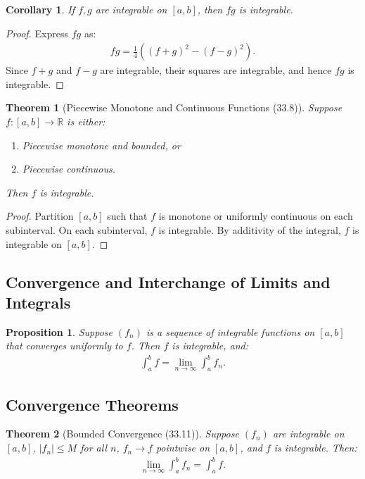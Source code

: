 \documentclass[9pt]{article}
\theoremstyle{definition}
\theoremstyle{plain}
\newtheorem{theorem}{Theorem}
\newtheorem{proposition}{Proposition}
\newtheorem{corollary}{Corollary}
\begin{document}
\begin{corollary}
If $ f, g $ are integrable on $ [a, b] $, then $ fg $ is integrable.
\end{corollary}

\begin{proof}
Express $ fg $ as:
\begin{align}
fg = \frac{1}{4} \left( (f + g)^2 - (f - g)^2 \right).
\end{align}
Since $ f + g $ and $ f - g $ are integrable, their squares are integrable, and hence $ fg $ is integrable.
\end{proof}

\begin{theorem}[Piecewise Monotone and Continuous Functions (33.8)]
Suppose $ f : [a, b] \to \mathbb{R} $ is either:
\begin{enumerate}
    \item Piecewise monotone and bounded, or
    \item Piecewise continuous.
\end{enumerate}
Then $ f $ is integrable.
\end{theorem}

\begin{proof}
Partition $ [a, b] $ such that $ f $ is monotone or uniformly continuous on each subinterval. On each subinterval, $ f $ is integrable. By additivity of the integral, $ f $ is integrable on $ [a, b] $.
\end{proof}

\subsection*{Convergence and Interchange of Limits and Integrals}
\begin{proposition}
Suppose $ (f_n) $ is a sequence of integrable functions on $ [a, b] $ that converges uniformly to $ f $. Then $ f $ is integrable, and:
\begin{align}
\int_a^b f = \lim_{n \to \infty} \int_a^b f_n.
\end{align}
\end{proposition}

\subsection*{Convergence Theorems}
\begin{theorem}[Bounded Convergence (33.11)]
Suppose $ (f_n) $ are integrable on $ [a, b] $, $ |f_n| \leq M $ for all $ n $, $ f_n \to f $ pointwise on $ [a, b] $, and $ f $ is integrable. Then:
\begin{align}
\lim_{n \to \infty} \int_a^b f_n = \int_a^b f.
\end{align}
\end{theorem}
\end{document}
